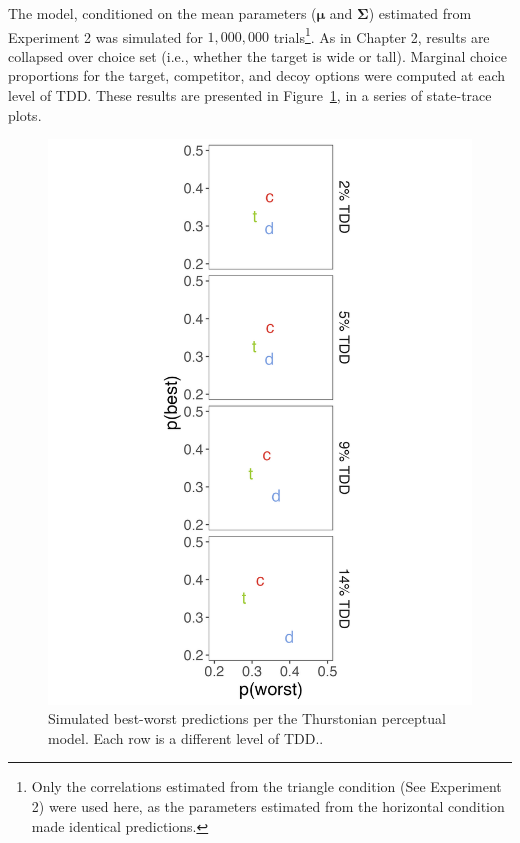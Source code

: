 The model, conditioned on the mean parameters ($\boldsymbol{\mu}$ and $\boldsymbol{\Sigma}$) estimated from Experiment 2 was simulated for $1,000,000$ trials\footnote{Only the correlations estimated from the triangle condition (See Experiment 2) were used here, as the parameters estimated from the horizontal condition made identical predictions.}. As in Chapter 2, results are collapsed over choice set (i.e., whether the target is wide or tall). Marginal choice proportions for the target, competitor, and decoy options were computed at each level of TDD. These results are presented in Figure~\ref{fig:bw_sim}, in a series of state-trace plots.
\begin{figure}
   \includegraphics[width=\linewidth]{figures/bw_preds_sigma_constant_comp_effect_no_outliers.jpeg}
   \caption{Simulated best-worst predictions per the Thurstonian perceptual model. Each row is a different level of TDD..}
   \label{fig:bw_sim}
\end{figure}

